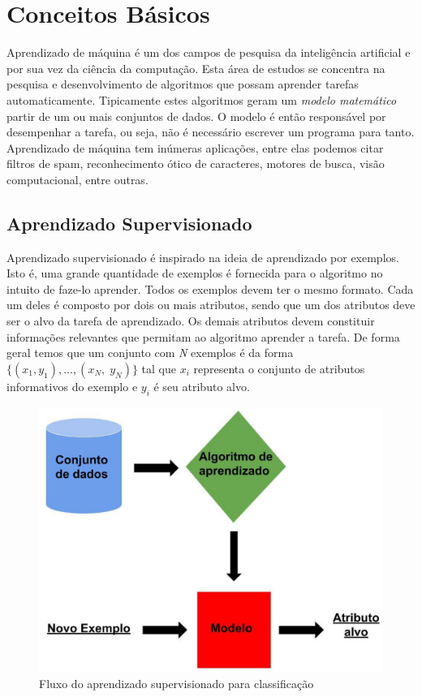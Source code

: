\chapter{Conceitos Básicos}

Aprendizado de máquina é um dos campos de pesquisa da inteligência artificial e por sua vez da ciência da computação.
Esta área de estudos se concentra na pesquisa e desenvolvimento de algoritmos que possam aprender tarefas automaticamente.
Tipicamente estes algoritmos geram um \textit{modelo matemático} partir de um ou mais conjuntos de dados.
O modelo é então responsável por desempenhar a tarefa, ou seja, não é necessário escrever um programa para tanto.
Aprendizado de máquina tem inúmeras aplicações, entre elas podemos citar filtros de spam, reconhecimento ótico de caracteres, motores de busca, visão computacional, entre outras.

\section{Aprendizado Supervisionado}

Aprendizado supervisionado é inspirado na ideia de aprendizado por exemplos.
Isto é, uma grande quantidade de exemplos é fornecida para o algoritmo no intuito de faze-lo aprender.
Todos os exemplos devem ter o mesmo formato.
Cada um deles é composto por dois ou mais atributos, sendo que um dos atributos deve ser o alvo da tarefa de aprendizado.
Os demais atributos devem constituir informações relevantes que permitam ao algoritmo aprender a tarefa.
De forma geral temos que um conjunto com \textit{N} exemplos é da forma $ \{(x_1, y_1), ..., (x_N,\; y_N)\} $ tal que $x_i$ representa o conjunto de atributos informativos do exemplo e $y_i$ é seu atributo alvo.

\begin{figure}[h!]
  \includegraphics[width=\linewidth]{images/conceitosbasicos01.eps}
  \caption{Fluxo do aprendizado supervisionado para classificação}
  \label{fig:conceitosbasicos01}
\end{figure}

